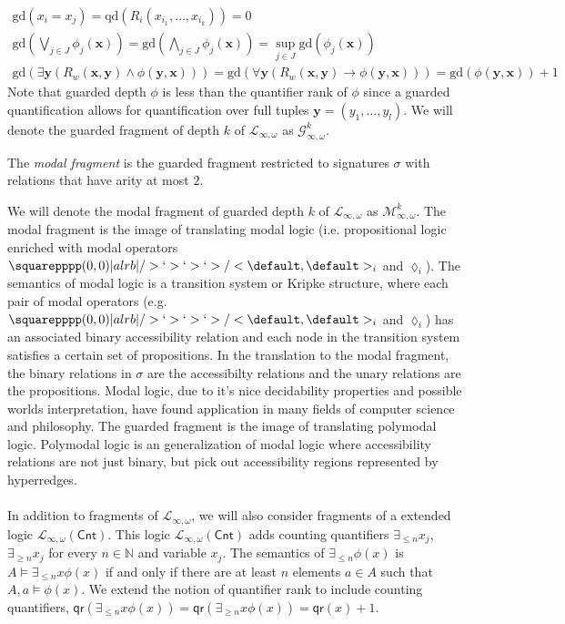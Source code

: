 \begin{eqnarray*}
\text{gd}(x_{i} = x_{j}) = \text{qd}(R_{i}(x_{i_{1}},\dots,x_{i_{k}})) = 0 \\
\text{gd}(\bigvee_{j \in J} \phi_{j}(\mathbf{x})) = \text{gd}(\bigwedge_{j \in J} \phi_{j}(\mathbf{x}))  = \sup_{j \in J} \text{gd}(\phi_{j}(\mathbf{x})) \\
\text{gd}(\exists \mathbf{y} (R_{w}(\mathbf{x},\mathbf{y}) \wedge \phi(\mathbf{y},\mathbf{x}))) = \text{gd}(\forall \mathbf{y}(R_{w}(\mathbf{x},\mathbf{y}) \rightarrow \phi(\mathbf{y},\mathbf{x}))) = \text{gd}(\phi(\mathbf{y},\mathbf{x})) + 1 
\end{eqnarray*}
Note that guarded depth $\phi$ is less than the quantifier rank of $\phi$ since a guarded quantification allows for quantification over full tuples $\mathbf{y} = (y_{1},\dots,y_{l})$. We will denote the guarded fragment of depth $k$ of $\mathcal{L}_{\infty,\omega}$ as $\mathcal{G}^{k}_{\infty,\omega}$.
\begin{defn}
The \textit{modal fragment} is the guarded fragment restricted to signatures $\sigma$ with relations that have arity at most $2$. 
\end{defn}
We will denote the modal fragment of guarded depth $k$ of $\mathcal{L}_{\infty,\omega}$ as $\mathcal{M}^{k}_{\infty,\omega}$.
The modal fragment is the image of translating modal logic (i.e. propositional logic enriched with modal operators $\amssquare_{i}$ and $\lozenge_{i}$). The semantics of modal logic is a transition system or Kripke structure, where each pair of modal operators (e.g. $\amssquare_{i}$ and $\lozenge_{i}$) has an associated binary accessibility relation and each node in the transition system satisfies a certain set of propositions. In the translation to the modal fragment, the binary relations in $\sigma$ are the accessibilty relations and the unary relations are the propositions. Modal logic, due to it's nice decidability properties and possible worlds interpretation, have found application in many fields of computer science and philosophy. The guarded fragment is the image of translating polymodal logic. Polymodal logic is an generalization of modal logic where accessibility relations are not just binary, but pick out accessibility regions represented by hyperredges. \\~\\    
In addition to fragments of $\mathcal{L}_{\infty,\omega}$, we will also consider fragments of a extended logic $\mathcal{L}_{\infty,\omega}(\mathsf{Cnt})$. This logic $\mathcal{L}_{\infty,\omega}(\mathsf{Cnt})$ adds counting quantifiers $\exists_{\leq n}x_{j}$, $\exists_{\geq n}x_{j}$ for every $n \in \mathbb{N}$ and variable $x_{j}$. The semantics of $\exists_{\leq n}\phi(x)$ is $A \vDash \exists_{\leq n}x \phi(x)$ if and only if there are at least $n$ elements $a \in A$ such that $A,a \vDash \phi(x)$. We extend the notion of quantifier rank to include counting quantifiers, $\mathsf{qr}(\exists_{\leq n}x\phi(x)) = \mathsf{qr}(\exists_{\geq n}x\phi(x)) = \mathsf{qr}(x) + 1$.  
